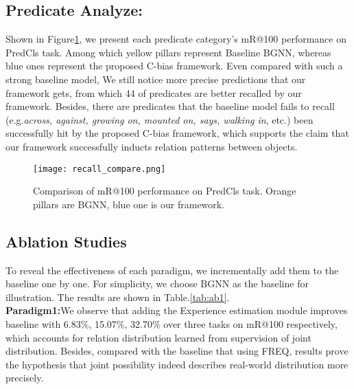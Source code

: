 \documentclass[runningheads]{llncs}
\begin{document}
\subsection{Predicate Analyze:}
Shown in Figure\ref{predicate}, we present each predicate category's mR@100
performance on PredCls task. Among which yellow pillars represent Baseline
BGNN, whereas blue ones represent the proposed C-bias framework. Even compared
with such a strong baseline model, We still notice more precise predictions
that our framework gets, from which 44 of predicates are better recalled by our
framework. Besides, there are predicates that the baseline model fails to
recall (e.g.\textit{across, against, growing on, mounted on, says, walking in},
etc.) been successfully hit by the proposed C-bias framework, which supports
the claim that our framework successfully inducts relation patterns between
objects.

\begin{figure}[t]
  \centering
  \texttt{[image: recall\_compare.png]}
  \caption{Comparison of mR@100 performance  on PredCls task. Orange pillars
    are BGNN, blue one is our framework. }
  \label{predicate}
\end{figure}
\subsection{Ablation Studies}
To reveal the effectiveness of each paradigm, we incrementally add them to the
baseline one by one. For simplicity, we choose BGNN as the baseline for
illustration. The results are shown in Table.\ref{tab:ab1}.\\

\noindent\textbf{Paradigm1:}We observe that adding the Experience estimation
module improves baseline with 6.83\%, 15.07\%, 32.70\% over three tasks on
mR@100 respectively, which accounts for relation distribution learned from
supervision of joint distribution. Besides, compared with the baseline that
using FREQ\cite{motif}, results prove the hypothesis that joint possibility
indeed describes real-world distribution more precisely.\\
\end{document}
